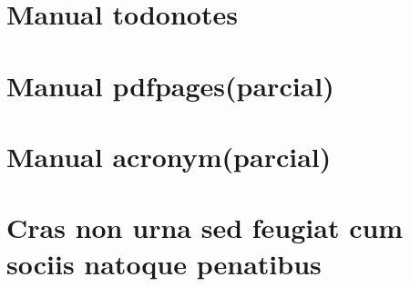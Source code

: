 
\begin{anexosenv}

\partanexos

\chapter{Manual todonotes}
\label{manual-todonotes}


\chapter{Manual pdfpages(parcial)}


\chapter{Manual acronym(parcial)}



\chapter{Cras non urna sed feugiat cum sociis natoque penatibus}

\lipsum[1]



\end{anexosenv}
